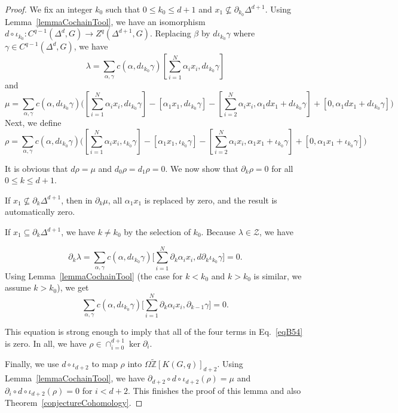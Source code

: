 \documentclass[reprint, amsmath, amssymb, showpacs, floatfix, longbibliography, aps, twocolumn, superscriptaddress, nofootinbib]{revtex4-2}
\newcommand{\tZ}{{\widetilde{\mathbb Z}}}
\theoremstyle{definition}
\begin{document}
\begin{proof}
	We fix an integer $k_0$ such that $0\le k_0\le d+1$ and $x_1\nsubseteq \partial_{k_0}\Delta^{d+1}$. Using Lemma~\ref{lemmaCochainTool}, we have an isomorphism $d\circ \iota_{k_0}:C^{q-1}(\Delta^{d},G)\rightarrow Z^q(\Delta^{d+1},G)$. Replacing $\beta$ by $d \iota_{k_0}\gamma$ where $\gamma\in C^{q-1}(\Delta^{d},G)$, we have
	\begin{equation}
		\lambda=\sum_{\alpha,\gamma} c(\alpha,d \iota_{k_0}\gamma)[\sum_{i=1}^N \alpha_ix_i,d \iota_{k_0}\gamma]
	\end{equation}
	and
	\begin{equation}
		\mu=\sum_{\alpha,\gamma} c(\alpha,d \iota_{k_0}\gamma)\bigg([\sum_{i=1}^N \alpha_ix_i,d \iota_{k_0}\gamma]-[\alpha_1x_1,d \iota_{k_0}\gamma]-[\sum_{i=2}^N \alpha_ix_i,\alpha_1dx_1+d \iota_{k_0}\gamma]+[0,\alpha_1dx_1+d \iota_{k_0}\gamma]\bigg)
	\end{equation}
	Next, we define
	\begin{equation}\label{eqB54}
		\rho=\sum_{\alpha,\gamma} c(\alpha, d\iota_{k_0}\gamma)\bigg([\sum_{i=1}^N \alpha_ix_i, \iota_{k_0}\gamma]-[\alpha_1x_1, \iota_{k_0}\gamma]-[\sum_{i=2}^N \alpha_ix_i,\alpha_1x_1+ \iota_{k_0}\gamma]+[0,\alpha_1x_1+ \iota_{k_0}\gamma]\bigg)
	\end{equation}
	
	It is obvious that $d\rho=\mu$ and $d_0\rho=d_1\rho=0$. We now show that $\partial_k\rho=0$ for all $0\le k\le d+1$.
	
	
	If $x_1\nsubseteq \partial_{k}\Delta^{d+1}$, then in $\partial_k\mu$, all $\alpha_1x_1$ is replaced by zero, and the result is automatically zero.
	
	If $x_1\subseteq \partial_{k}\Delta^{d+1}$, we have $k\ne k_0$ by the selection of $k_0$. Because $\lambda\in\mathcal{Z}$, we have
	
	\begin{equation}
		\partial_k\lambda=\sum_{\alpha,\gamma} c(\alpha,d \iota_{k_0}\gamma)\bigg[\sum_{i=1}^N\partial_k \alpha_ix_i,d\partial_k\iota_{k_0}\gamma\bigg]=0.
	\end{equation}
	Using Lemma~\ref{lemmaCochainTool} (the case for $k<k_0$ and $k>k_0$ is similar, we assume $k>k_0$), we get
	\begin{equation}
		\sum_{\alpha,\gamma} c(\alpha,d \iota_{k_0}\gamma)\bigg[\sum_{i=1}^N\partial_k \alpha_ix_i,\partial_{k-1}\gamma\bigg]=0.
	\end{equation}
	
	This equation is strong enough to imply that all of the four terms in Eq.~\eqref{eqB54} is zero. In all, we have $\rho\in \cap_{i=0}^{d+1}\ker \partial_i$.
	
	Finally, we use $d\circ \iota_{d+2}$ to map $\rho$ into $\Omega\tZ[K(G,q)]_{d+2}$. Using Lemma~\ref{lemmaCochainTool}, we have $\partial_{d+2}\circ d\circ \iota_{d+2}(\rho)=\mu$ and $\partial_{i}\circ d\circ \iota_{d+2}(\rho)=0$ for $i<d+2$.
	This finishes the proof of this lemma and also Theorem~\ref{conjectureCohomology}.
\end{proof}
 
\end{document}
